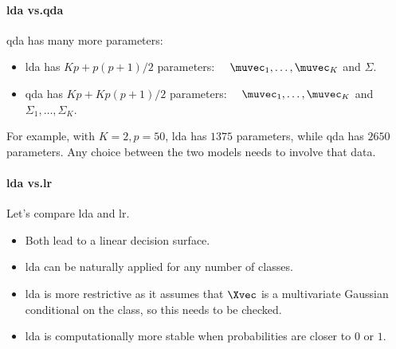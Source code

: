 \paragraph{\acs{lda} vs.\@ \acs{qda}}

\acs{qda} has many more parameters:
\begin{itemize}
    \item \acs{lda} has $Kp + p(p+1)/2$ parameters: $\quad\muvec_1, \ldots, \muvec_K$ and $\Sigma$.
    \item \acs{qda} has $Kp + Kp(p+1)/2$ parameters: $\quad\muvec_1, \ldots, \muvec_K$ and $\Sigma_1, \ldots, \Sigma_K$.
\end{itemize}

\begin{example}
    For example, with $K = 2, p = 50$, \acs{lda} has $1375$ parameters, while \acs{qda} has $2650$ parameters. Any choice between the two models needs to involve that data.
\end{example}

\paragraph{\acs{lda} vs.\@ \acs{lr}}

Let's compare \acl{lda} and \acl{lr}.
\begin{itemize}
    \item Both lead to a linear decision surface.
    \item \acs{lda} can be naturally applied for any number of classes.
    \item \acs{lda} is more restrictive as it assumes that $\Xvec$ is a multivariate Gaussian conditional on the class, so this needs to be checked.
    \item \acs{lda} is computationally more stable when probabilities are closer to $0$ or $1$.
\end{itemize}